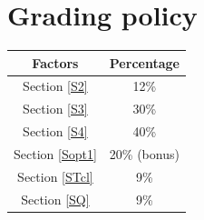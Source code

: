 \documentclass[a4paper,12pt,twoside]{article}
\begin{document}
\section{Grading policy}
\begin{table}[H]
    \centering
    \begin{tabular}{|c|c|}
        \hline
        Factors & Percentage \\
        \hline
        Section \ref{S2} & 12\% \\
        \hline
        Section \ref{S3} & 30\% \\
        \hline
        Section \ref{S4} & 40\% \\
        \hline
        Section \ref{Sopt1} & 20\% (bonus) \\
        \hline
        Section \ref{STcl} & 9\% \\
        \hline
        Section \ref{SQ} & 9\% \\
        \hline
    \end{tabular}
\end{table}

\newpage
\appendix
\end{document}
